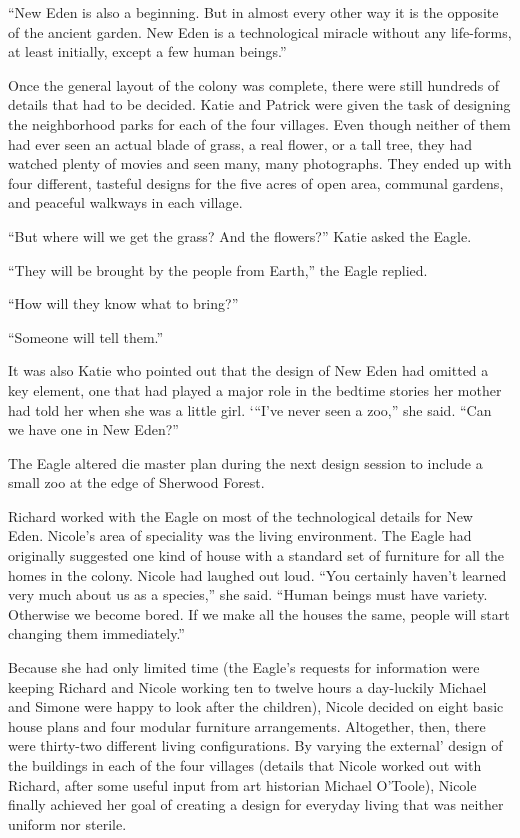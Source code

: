 \documentclass[]{article}
\begin{document}
{“New Eden is also a beginning.  But in almost every other way it is the opposite of the ancient garden.  New Eden is a technological miracle without any life-forms, at least initially, except a few human beings.”

Once the general layout of the colony was complete, there were still hundreds of details that had to be decided.  Katie and Patrick were given the task of designing the neighborhood parks for each of the four villages.  Even though neither of them had ever seen an actual blade of grass, a real flower, or a tall tree, they had watched plenty of movies and seen many, many photographs.  They ended up with four different, tasteful designs for the five acres of open area, communal gardens, and peaceful walkways in each village.

“But where will we get the grass? And the flowers?” Katie asked the Eagle.

“They will be brought by the people from Earth,” the Eagle replied.

“How will they know what to bring?”

“Someone will tell them.”

It was also Katie who pointed out that the design of New Eden had omitted a key element, one that had played a major role in the bedtime stories her mother had told her when she was a little girl.  ‘“I’ve never seen a zoo,” she said.  “Can we have one in New Eden?”

The Eagle altered die master plan during the next design session to include a small zoo at the edge of Sherwood Forest.

Richard worked with the Eagle on most of the technological details for New Eden.  Nicole’s area of speciality was the living environment.  The Eagle had originally suggested one kind of house with a standard set of furniture for all the homes in the colony.  Nicole had laughed out loud.  “You certainly haven’t learned very much about us as a species,” she said.  “Human beings must have variety.  Otherwise we become bored.  If we make all the houses the same, people will start changing them immediately.”

Because she had only limited time (the Eagle’s requests for information were keeping Richard and Nicole working ten to twelve hours a day-luckily Michael and Simone were happy to look after the children), Nicole decided on eight basic house plans and four modular furniture arrangements.  Altogether, then, there were thirty-two different living configurations.  By varying the external’ design of the buildings in each of the four villages (details that Nicole worked out with Richard, after some useful input from art historian Michael O’Toole), Nicole finally achieved her goal of creating a design for everyday living that was neither uniform nor sterile.

}
\end{document}
